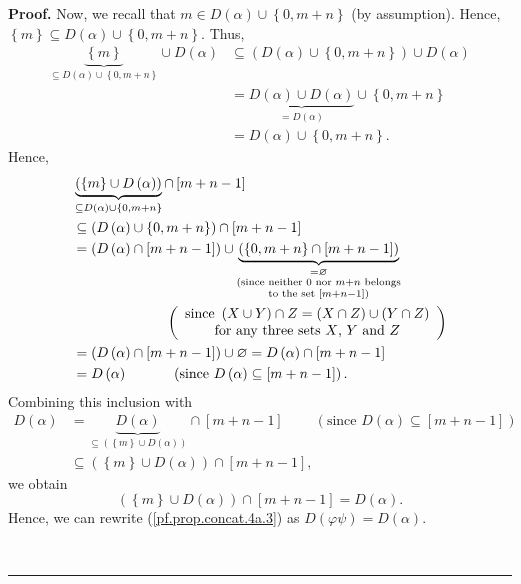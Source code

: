 \documentclass[numbers=enddot,12pt,final,onecolumn,notitlepage]{scrartcl}%
\theoremstyle{definition}
\newenvironment{proof}[1][Proof]{\noindent\textbf{#1.} }{\ \rule{0.5em}{0.5em}}
\begin{document}
\begin{proof}
Now, we recall that $m\in D\left(  \alpha\right)  \cup\left\{  0,m+n\right\}
$ (by assumption). Hence, $\left\{  m\right\}  \subseteq D\left(
\alpha\right)  \cup\left\{  0,m+n\right\}  $. Thus,%
\begin{align*}
\underbrace{\left\{  m\right\}  }_{\subseteq D\left(  \alpha\right)
\cup\left\{  0,m+n\right\}  }\cup D\left(  \alpha\right)   &  \subseteq\left(
D\left(  \alpha\right)  \cup\left\{  0,m+n\right\}  \right)  \cup D\left(
\alpha\right) \\
&  =\underbrace{D\left(  \alpha\right)  \cup D\left(  \alpha\right)
}_{=D\left(  \alpha\right)  }\cup\left\{  0,m+n\right\} \\
&  =D\left(  \alpha\right)  \cup\left\{  0,m+n\right\}  .
\end{align*}
Hence,%
\begin{align*}
&  \underbrace{\left(  \left\{  m\right\}  \cup D\left(  \alpha\right)
\right)  }_{\subseteq D\left(  \alpha\right)  \cup\left\{  0,m+n\right\}
}\cap\left[  m+n-1\right] \\
&  \subseteq\left(  D\left(  \alpha\right)  \cup\left\{  0,m+n\right\}
\right)  \cap\left[  m+n-1\right] \\
&  =\left(  D\left(  \alpha\right)  \cap\left[  m+n-1\right]  \right)
\cup\underbrace{\left(  \left\{  0,m+n\right\}  \cap\left[  m+n-1\right]
\right)  }_{\substack{=\varnothing\\\text{(since neither }0\text{ nor
}m+n\text{ belongs}\\\text{to the set }\left[  m+n-1\right]  \text{)}}}\\
&  \ \ \ \ \ \ \ \ \ \ \ \ \ \ \ \ \ \ \ \ \left(
\begin{array}
[c]{c}%
\text{since }\left(  X\cup Y\right)  \cap Z=\left(  X\cap Z\right)
\cup\left(  Y\cap Z\right) \\
\text{for any three sets }X\text{, }Y\text{ and }Z
\end{array}
\right) \\
&  =\left(  D\left(  \alpha\right)  \cap\left[  m+n-1\right]  \right)
\cup\varnothing=D\left(  \alpha\right)  \cap\left[  m+n-1\right] \\
&  =D\left(  \alpha\right)  \ \ \ \ \ \ \ \ \ \ \left(  \text{since }D\left(
\alpha\right)  \subseteq\left[  m+n-1\right]  \right)  .
\end{align*}
Combining this inclusion with%
\begin{align*}
D\left(  \alpha\right)   &  =\underbrace{D\left(  \alpha\right)  }%
_{\subseteq\left(  \left\{  m\right\}  \cup D\left(  \alpha\right)  \right)
}\cap\left[  m+n-1\right]  \ \ \ \ \ \ \ \ \ \ \left(  \text{since }D\left(
\alpha\right)  \subseteq\left[  m+n-1\right]  \right) \\
&  \subseteq\left(  \left\{  m\right\}  \cup D\left(  \alpha\right)  \right)
\cap\left[  m+n-1\right]  ,
\end{align*}
we obtain%
\[
\left(  \left\{  m\right\}  \cup D\left(  \alpha\right)  \right)  \cap\left[
m+n-1\right]  =D\left(  \alpha\right)  .
\]
Hence, we can rewrite (\ref{pf.prop.concat.4a.3}) as $D\left(  \varphi
\psi\right)  =D\left(  \alpha\right)  $.


\end{proof}
\end{document}
